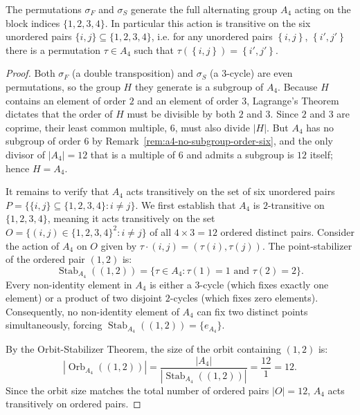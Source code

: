 \begin{proposition}\label{prop:full-equivalence}
    The permutations \( \sigma_F \) and \( \sigma_S \) generate the
    full alternating group \( A_4 \) acting on the block indices
    \( \{1,2,3,4\} \). In particular this action is transitive on the
    six unordered pairs \( \{i,j\} \subseteq \{1,2,3,4\} \), i.e. for
    any unordered pairs \( \left\{ i, j \right\} \), \( \left\{ i' ,
    j' \right\} \)
    there is a permutation \( \tau \in A_4 \) such that \(
    \tau(\left\{ i, j \right\}) = \left\{ i' , j' \right\} \).
\end{proposition}

\begin{proof}
    Both \( \sigma_F \) (a double transposition) and \( \sigma_S \) (a
    \( 3 \)-cycle) are even permutations, so the group \( H \) they
    generate is a subgroup of \( A_4 \). Because \( H \) contains an
    element of order \( 2 \) and an element of order \( 3 \), Lagrange's
    Theorem dictates that the order of \( H \) must be divisible by both
    \( 2 \) and \( 3 \). Since \( 2 \) and \( 3 \) are coprime, their least
    common multiple, \( 6 \), must also divide \( |H| \). But \( A_4
    \) has no subgroup of order \( 6 \) by
    Remark~\ref{rem:a4-no-subgroup-order-six}, and the only divisor
    of \( |A_4|=12 \) that is a multiple of \( 6 \) and admits a
    subgroup is \( 12 \) itself; hence \( H = A_4 \).

    It remains to verify that \( A_4 \) acts transitively on the set
    of six unordered pairs \( P = \{ \{i,j\} \subseteq
    \{1,2,3,4\} : i \neq j \} \).
    We first establish that \( A_4 \) is \( 2 \)-transitive on \(
    \{1,2,3,4\} \), meaning it acts transitively on the set \(
    O = \{ (i,j) \in \{1,2,3,4\}^2 : i \neq j \} \) of all
    \( 4 \times 3 = 12 \) ordered distinct pairs. Consider the action
    of \( A_4 \) on \( O \) given by \( \tau \cdot (i,j) =
    (\tau(i), \tau(j)) \). The point-stabilizer of the ordered pair
    \( (1,2) \) is:
    \[
        \operatorname{Stab}_{A_4}((1,2)) = \{ \tau \in A_4 : \tau(1)
        = 1 \text{ and } \tau(2) = 2 \}.
    \]
    Every non-identity element in \( A_4 \) is either a \( 3 \)-cycle
    (which fixes exactly one element) or a product of two disjoint \(
    2 \)-cycles (which fixes zero elements). Consequently, no
    non-identity element of \( A_4 \) can fix two distinct points
    simultaneously, forcing \( \operatorname{Stab}_{A_4}((1,2)) =
    \{e_{A_4}\} \).

    By the Orbit-Stabilizer Theorem, the size of the orbit containing
    \( (1,2) \) is:
    \[
        |\operatorname{Orb}_{A_4}((1,2))| =
        \frac{|A_4|}{|\operatorname{Stab}_{A_4}((1,2))|} = \frac{12}{1} = 12.
    \]
    Since the orbit size matches the total number of ordered pairs \(
    |O| = 12 \), \( A_4 \) acts transitively on ordered pairs.


\end{proof}
